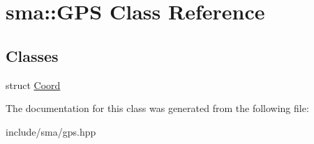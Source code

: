 \hypertarget{classsma_1_1GPS}{\section{sma\-:\-:G\-P\-S Class Reference}
\label{classsma_1_1GPS}
}
\subsection*{Classes}
\begin{DoxyCompactItemize}
\item 
struct \hyperlink{structsma_1_1GPS_1_1Coord}{Coord}
\end{DoxyCompactItemize}


The documentation for this class was generated from the following file\-:\begin{DoxyCompactItemize}
\item 
include/sma/gps.\-hpp\end{DoxyCompactItemize}
